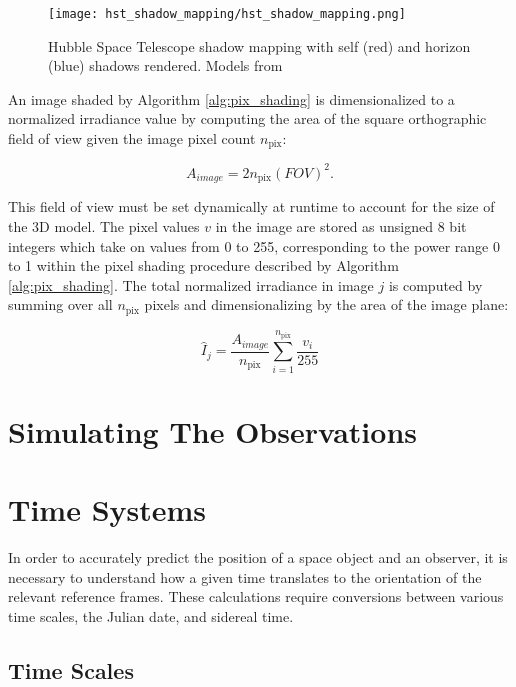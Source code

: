 \begin{figure}[!htb]
  \centering
  \texttt{[image: hst\_shadow\_mapping/hst\_shadow\_mapping.png]}
  \caption{Hubble Space Telescope shadow mapping with self (red) and horizon (blue) shadows rendered. Models from \cite{nasa_models}}
  \label{fig:hst_shadows_map}
\end{figure}
\graphicspath{{/Users/liamrobinson/Documents/PyLightCurves/docs/build/html/_images}}

An image shaded by Algorithm \ref{alg:pix_shading} is dimensionalized to a normalized irradiance value by computing the area of the square orthographic field of view given the image pixel count $n_\mathrm{pix}$:

\begin{equation} \label{eq:ortho_area}
  A_{image} = 2 n_\mathrm{pix} \left(FOV \right)^2.
\end{equation}

This field of view must be set dynamically at runtime to account for the size of the 3D model. The pixel values $v$ in the image are stored as unsigned 8 bit integers which take on values from 0 to 255, corresponding to the power range 0 to 1 within the pixel shading procedure described by Algorithm \ref{alg:pix_shading}. The total normalized irradiance in image $j$ is computed by summing over all $n_\mathrm{pix}$ pixels and dimensionalizing by the area of the image plane:

\begin{equation} \label{eq:lc_normalized_engine}
  \hat{I}_j = \frac{A_{image}}{n_\mathrm{pix}} \sum_{i=1}^{n_\mathrm{pix}}{\frac{v_{i}}{255}}
\end{equation}

\section{Simulating The Observations}

\section{Time Systems}

In order to accurately predict the position of a space object and an observer, it is necessary to understand how a given time translates to the orientation of the relevant reference frames. These calculations require conversions between various time scales, the Julian date, and sidereal time.

\subsection{Time Scales}


